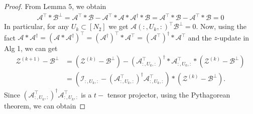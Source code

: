 \documentclass[aspectratio=169]{beamer}
\def\fm#1{\mathcal{#1}}
\def\fm#1{\mathcal{#1}}
\def \a#1{\fm A_{:, #1, :}}
\begin{document}
\begin{frame}{}
    \begin{proof} From Lemma 5, we obtain 
\begin{align*}
    \fm A^\top *\fm B^\perp  =\fm A^\top  *\fm B - \fm A^\top * \fm A * \fm A^\dagger * \fm B =\fm A ^\top * \fm B  - \fm A ^\top * \fm B = 0
\end{align*}
In particular, for any $U_k \subset [N_2]$  we get $\fm A(:, U_k, :)^\top \fm B^\perp = 0$.
Now, using the fact $\fm A * \fm A^\dagger = \left(\fm A * \fm  A^\dagger \right)^\top = (\fm A^\dagger)^\top * \fm A ^\top = (\fm A^\top )^\dagger * \fm A^\top   $  and the $z$-update in Alg 1, we can get
\begin{align*}
    \fm Z^{(k+1)} - \fm B^\perp  & = \left(\fm Z^{(k)} - \fm B^\perp\right) - \left(\fm A^\top_{:, {U_k}, :} \right)^\dagger* \fm A^\top_{:, U_k, :} *\left( \fm Z ^{(k)}-\fm B^\perp \right)\\
    & = \left(\fm I_{:, U_k, :} - \left( \a{U_k}^\top\right) ^\dagger \a{U_k}^\top\right)*\left( \fm Z^{(k)}- \fm B^\perp \right).
\end{align*}
Since $\left( \a{U_k}^\top\right) ^\dagger \a{U_k}^\top$  is a $t-$ tensor projector,  using the Pythagorean theorem,  we can obtain

\end{proof}
\end{frame}
\end{document}
